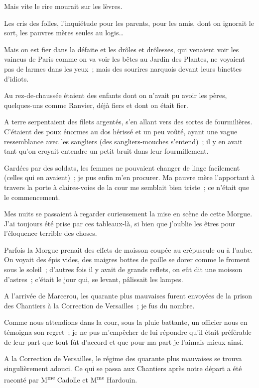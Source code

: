 \documentclass[french,twoside]{book} %
\begin{document}
\noindent Mais vite le rire mourait sur les lèvres.\par
Les cris des folles, l’inquiétude pour les parents, pour les amis, dont on ignorait le sort, les pauvres mères seules au logis…\par
Mais on est fier dans la défaite et les drôles et drôlesses, qui venaient voir les vaincus de Paris comme on va voir les bêtes au Jardin des Plantes,  ne voyaient pas de larmes dans les yeux ; mais des sourires narquois devant leurs binettes d’idiots.\par
Au rez-de-chaussée étaient des enfants dont on n’avait pu avoir les pères, quelques-uns comme Ranvier, déjà fiers et dont on était fier.\par
A terre serpentaient des filets argentés, s’en allant vers des sortes de fourmilières. C’étaient des poux énormes au dos hérissé et un peu voûté, ayant une vague ressemblance avec les sangliers (des sangliers-mouches s’entend) ; il y en avait tant qu’on croyait entendre un petit bruit dans leur fourmillement.\par
Gardées par des soldats, les femmes ne pouvaient changer de linge facilement (celles qui en avaient) ; je pus enfin m’en procurer. Ma pauvre mère l’apportant à travers la porte à claires-voies de la cour me semblait bien triste ; ce n’était que le commencement.\par
Mes nuits se passaient à regarder curieusement la mise en scène de cette Morgue. J’ai toujours été prise par ces tableaux-là, si bien que j’oublie les êtres pour l’éloquence terrible des choses.\par
Parfois la Morgue prenait des effets de moisson coupée au crépuscule ou à l’aube. On voyait des épis vides, des maigres bottes de paille se dorer comme le froment sous le soleil ; d’autres fois il  y avait de grands reflets, on eût dit une moisson d’astres ; c’était le jour qui, se levant, pâlissait les lampes.\par
A l’arrivée de Marcerou, les quarante plus mauvaises furent envoyées de la prison des Chantiers à la Correction de Versailles ; je fus du nombre.\par
Comme nous attendions dans la cour, sous la pluie battante, un officier nous en témoigna son regret ; je ne pus m’empêcher de lui répondre qu’il était préférable de leur part que tout fût d’accord et que pour ma part je l’aimais mieux ainsi.\par
A la Correction de Versailles, le régime des quarante plus mauvaises se trouva singulièrement adouci. Ce qui se passa aux Chantiers après notre départ a été raconté par M\textsuperscript{me} Cadolle et M\textsuperscript{me} Hardouin.\par
\end{document}
